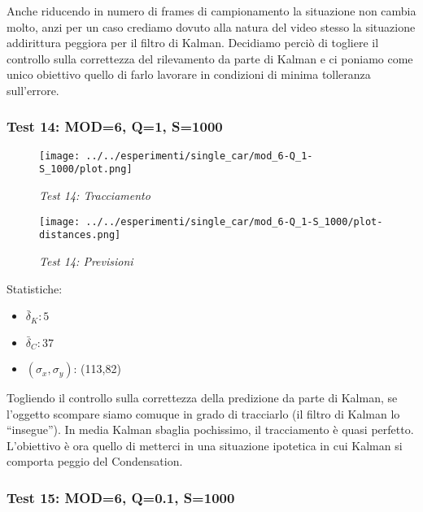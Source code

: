 Anche riducendo in numero di frames di campionamento la situazione non cambia molto, anzi per un caso crediamo dovuto alla natura del video stesso la situazione addirittura peggiora per il filtro di Kalman.
Decidiamo perciò di togliere il controllo sulla correttezza del rilevamento da parte di Kalman e ci poniamo come unico obiettivo quello di farlo lavorare in condizioni di minima tolleranza sull'errore.

\newpage
\subsubsection{Test 14: MOD=6, Q=1, S=1000}

\begin{figure}[hb]
\centering
\texttt{[image: ../../esperimenti/single\_car/mod\_6-Q\_1-S\_1000/plot.png]}
\caption{\textit{Test 14: Tracciamento}}
\end{figure}

\begin{figure}[hb]
\centering
\texttt{[image: ../../esperimenti/single\_car/mod\_6-Q\_1-S\_1000/plot-distances.png]}
\caption{\textit{Test 14: Previsioni}}
\end{figure}

Statistiche:
\begin{itemize}
\item \begin{math} \bar \delta_K: 5 \end{math}
\item \begin{math} \bar \delta_C: 37 \end{math}
\item \begin{math}(\sigma_x,\sigma_y)\end{math}: (113,82)
\end{itemize}

Togliendo il controllo sulla correttezza della predizione da parte di Kalman, se l'oggetto scompare siamo comuque in grado di tracciarlo (il filtro di Kalman lo ``insegue''). In media Kalman sbaglia pochissimo, il tracciamento è quasi perfetto.
L'obiettivo è ora quello di metterci in una situazione ipotetica in cui Kalman si comporta peggio del Condensation.

\newpage
\subsubsection{Test 15: MOD=6, Q=0.1, S=1000}


